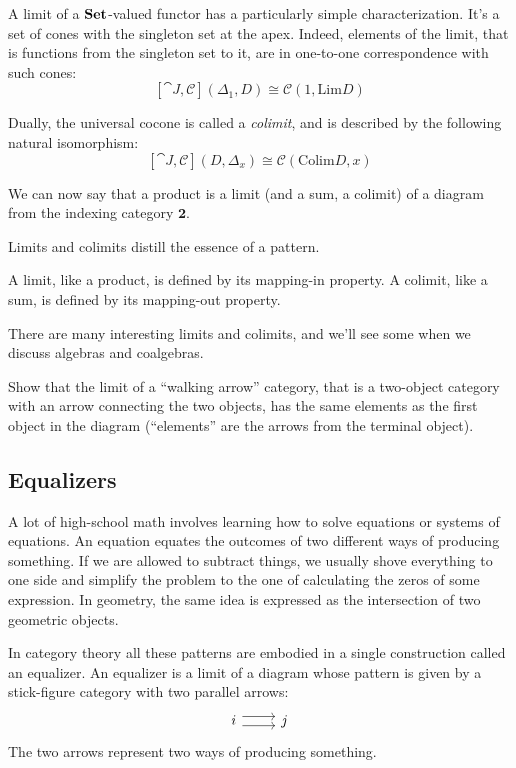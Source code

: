 \documentclass[DaoFP]{subfiles}
\begin{document}
A limit of a $\mathbf{Set}$-valued functor has a particularly simple characterization. It's a set of cones with the singleton set at the apex. Indeed, elements of the limit, that is functions from the singleton set to it, are in one-to-one correspondence with such cones:
\[ [\cat J, \mathcal{C}](\Delta_1, D)  \cong \mathcal{C}(1, \text{Lim}D) \]


Dually, the universal cocone is called a \emph{colimit}, and is described by the following natural isomorphism:
\[ [\cat J, \mathcal{C}](D, \Delta_x)  \cong \mathcal{C}( \text{Colim}D, x) \]


We can now say that a product is a limit (and a sum, a colimit) of a diagram from the indexing category $\mathbf{2}$.

Limits and colimits distill the essence of a pattern. 

A limit, like a product, is defined by its mapping-in property. A colimit, like a sum, is defined by its mapping-out property.

There are many interesting limits and colimits, and we'll see some when we discuss algebras and coalgebras.

\begin{exercise}
Show that the limit of a ``walking arrow'' category, that is a two-object category with an arrow connecting the two objects, has the same elements as the first object in the diagram (``elements'' are the arrows from the terminal object).
\end{exercise}

\subsection{Equalizers}

A lot of high-school math involves learning how to solve equations or systems of equations. An equation equates the outcomes of two different ways of producing something. If we are allowed to subtract things, we usually shove everything to one side and simplify the problem to the one of calculating the zeros of some expression. In geometry, the same idea is expressed as the intersection of two geometric objects.

In category theory all these patterns are embodied in a single construction called an equalizer. An equalizer is a limit of a diagram whose pattern is given by a stick-figure category with two parallel arrows:
\[
\begin{tikzcd}
i \arrow[r, shift left=0.75ex]
  \arrow[r, shift right=0.75ex]
&
j
\end{tikzcd}
\]
The two arrows represent two ways of producing something. 
\end{document}
